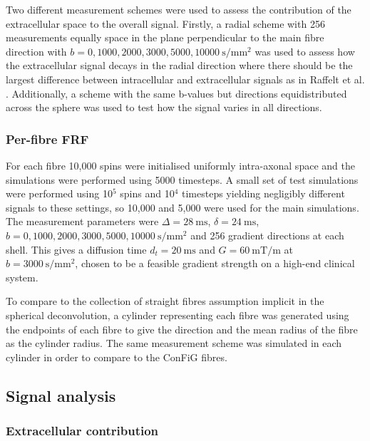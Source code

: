 Two different measurement schemes were used to assess the contribution of the extracellular space to the overall signal. Firstly, a radial scheme with 256 measurements equally space in the plane perpendicular to the main fibre direction with $b = 0, 1000, 2000, 3000, 5000, \SI{10000}{\second\per\milli\metre\squared}$ was used to assess how the extracellular signal decays in the radial direction where there should be the largest difference between intracellular and extracellular signals as in Raffelt et al. \cite{Raffelt2012}. Additionally, a scheme with the same b-values but directions equidistributed across the sphere was used to test how the signal varies in all directions.

\subsubsection{Per-fibre \ac{FRF}}

For each fibre 10,000 spins were initialised uniformly intra-axonal space and the simulations were performed using 5000 timesteps. A small set of test simulations were performed using 10$^5$ spins and 10$^4$ timesteps yielding negligibly different signals to these settings, so 10,000 and 5,000 were used for the main simulations. The measurement parameters were $\Delta = \SI{28}{\milli\second}$, $\delta = \SI{24}{\milli\second}$, $b = 0,1000,2000,3000,5000,\SI{10000}{\second\per\milli\metre\squared}$ and 256 gradient directions at each shell. This gives a diffusion time $d_t = \SI{20}{\milli\second}$ and $G = \SI{60}{\milli\tesla\per\metre}$ at $b = \SI{3000}{\second\per\milli\metre\squared}$, chosen to be a feasible gradient strength on a high-end clinical system.

To compare to the collection of straight fibres assumption implicit in the spherical deconvolution, a cylinder representing each fibre was generated using the endpoints of each fibre to give the direction and the mean radius of the fibre as the cylinder radius. The same measurement scheme was simulated in each cylinder in order to compare to the \ac{ConFiG} fibres. 

\subsection{Signal analysis}
\label{sec:frf_signal_analysis}

\subsubsection{Extracellular contribution}
\label{sec:frf_sig_proc_extra}

